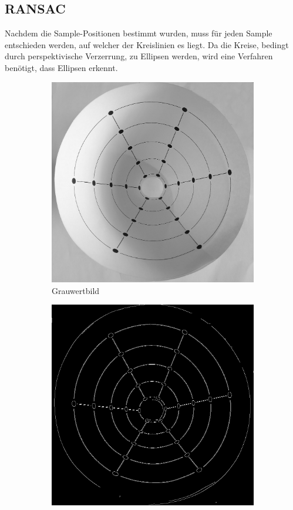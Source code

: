 \subsection{RANSAC}
Nachdem die Sample-Positionen bestimmt wurden, muss für jeden Sample entschieden werden, auf welcher der Kreislinien es liegt. Da die Kreise, bedingt durch perspektivische Verzerrung, zu Ellipsen werden, wird eine Verfahren
benötigt, dass Ellipsen erkennt.



\begin{figure}[!htb]
	\centering
	\begin{subfigure}{.5\textwidth}
		\centering
		\includegraphics[width=.9\textwidth]{images/grey.png}
		\caption{Grauwertbild}
		\label{fig:beforeCanny}
	\end{subfigure}%
	\begin{subfigure}{.5\textwidth}
		\centering
		\includegraphics[width=.9\textwidth]{images/canny.png}

\end{subfigure}
\end{figure}
